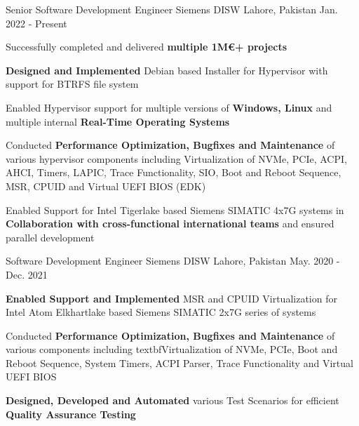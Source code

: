 

\begin{cventries}

  \cventry
    {Senior Software Development Engineer} %
    {Siemens DISW} %
    {Lahore, Pakistan} %
    {Jan. 2022 - Present} %
    {
      \begin{cvitems} %
        \item Successfully completed and delivered \textbf{multiple 1M€+ projects}
        \item \textbf{Designed and Implemented} Debian based Installer for Hypervisor with support for BTRFS file system
        \item Enabled Hypervisor support for multiple versions of \textbf{Windows, Linux} and multiple internal \textbf{Real-Time Operating Systems}
        \item Conducted \textbf{Performance Optimization, Bugfixes and Maintenance} of various hypervisor components including Virtualization of NVMe, PCIe, ACPI, AHCI, Timers, LAPIC, Trace Functionality, SIO, Boot and Reboot Sequence, MSR, CPUID and Virtual UEFI BIOS (EDK)
        \item Enabled Support for Intel Tigerlake based Siemens SIMATIC 4x7G systems in \textbf{Collaboration with cross-functional international teams} and ensured parallel development
      \end{cvitems}
    }

  \cventry
    {Software Development Engineer} %
    {Siemens DISW} %
    {Lahore, Pakistan} %
    {May. 2020 - Dec. 2021} %
    {
      \begin{cvitems} %
        \item \textbf{Enabled Support and Implemented} MSR and CPUID Virtualization for Intel Atom Elkhartlake based Siemens SIMATIC 2x7G series of systems
        \item Conducted \textbf{Performance Optimization, Bugfixes and Maintenance} of various components including textbf{Virtualization} of NVMe, PCIe, Boot and Reboot Sequence, System Timers, ACPI Parser, Trace Functionality and Virtual UEFI BIOS
        \item \textbf{Designed, Developed and Automated} various Test Scenarios for efficient \textbf{Quality Assurance Testing}
      \end{cvitems}
    }


\end{cventries}
